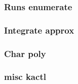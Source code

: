 \documentclass[a4paper,twocolumn]{article}
\begin{document}
\subsubsection{Runs enumerate}



\subsubsection{Integrate approx}


\subsubsection{Char poly}


\subsubsection{misc kactl}




% 




\end{document}
